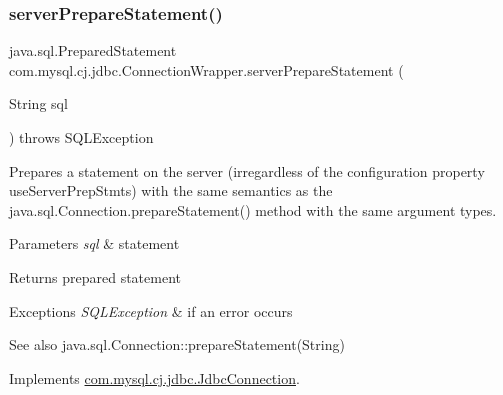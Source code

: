 \mbox{\label{classcom_1_1mysql_1_1cj_1_1jdbc_1_1_connection_wrapper_aa430608c339c22aff456a59210faaf8b}} 
\subsubsection{\texorpdfstring{server\+Prepare\+Statement()}{serverPrepareStatement()}\hspace{0.1cm}{\footnotesize\ttfamily [1/6]}}
{\footnotesize\ttfamily java.\+sql.\+Prepared\+Statement com.\+mysql.\+cj.\+jdbc.\+Connection\+Wrapper.\+server\+Prepare\+Statement (\begin{DoxyParamCaption}\item[{String}]{sql }\end{DoxyParamCaption}) throws S\+Q\+L\+Exception}

Prepares a statement on the server (irregardless of the configuration property \textquotesingle{}use\+Server\+Prep\+Stmts\textquotesingle{}) with the same semantics as the java.\+sql.\+Connection.\+prepare\+Statement() method with the same argument types.


\begin{DoxyParams}{Parameters}
{\em sql} & statement \\
\hline
\end{DoxyParams}
\begin{DoxyReturn}{Returns}
prepared statement 
\end{DoxyReturn}

\begin{DoxyExceptions}{Exceptions}
{\em S\+Q\+L\+Exception} & if an error occurs \\
\hline
\end{DoxyExceptions}
\begin{DoxySeeAlso}{See also}
java.\+sql.\+Connection\+::prepare\+Statement(\+String) 
\end{DoxySeeAlso}


Implements \mbox{\hyperlink{interfacecom_1_1mysql_1_1cj_1_1jdbc_1_1_jdbc_connection_add415475386bd7577301fddbdd5518b8}{com.\+mysql.\+cj.\+jdbc.\+Jdbc\+Connection}}.

